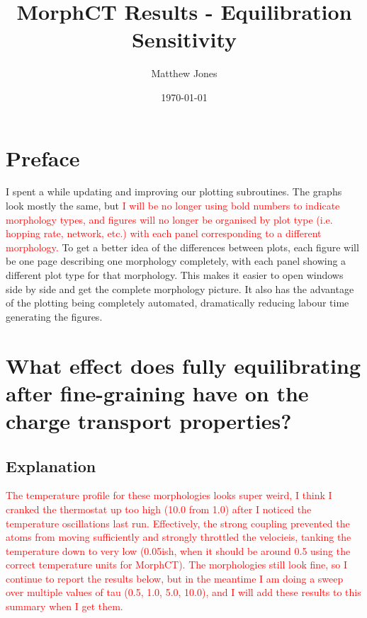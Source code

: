 \documentclass[12pt]{article}
\title{MorphCT Results - Equilibration Sensitivity}
\author{Matthew Jones}
\date{\today}
\begin{document}
\maketitle

\section{Preface}

I spent a while updating and improving our plotting subroutines.
The graphs look mostly the same, but \textcolor{red}{I will be no longer using bold numbers to indicate morphology types, and figures will no longer be organised by plot type (i.e. hopping rate, network, etc.) with each panel corresponding to a different morphology.}
To get a better idea of the differences between plots, each figure will be one page describing one morphology completely, with each panel showing a different plot type for that morphology.
This makes it easier to open windows side by side and get the complete morphology picture.
It also has the advantage of the plotting being completely automated, dramatically reducing labour time generating the figures.


\section{What effect does fully equilibrating after fine-graining have on the charge transport properties?}


\subsection{Explanation}


\textcolor{red}{The temperature profile for these morphologies looks super weird, I think I cranked the thermostat up too high (10.0 from 1.0) after I noticed the temperature oscillations last run.
Effectively, the strong coupling prevented the atoms from moving sufficiently and strongly throttled the velocieis, tanking the temperature down to very low (0.05ish, when it should be around 0.5 using the correct temperature units for MorphCT).
The morphologies still look fine, so I continue to report the results below, but in the meantime I am doing a sweep over multiple values of tau (0.5, 1.0, 5.0, 10.0), and I will add these results to this summary when I get them.
}
\end{document}

